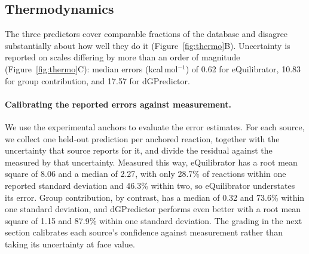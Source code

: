 \subsection{Thermodynamics}\label{sec:results-thermo}

The three predictors cover comparable fractions of the database and disagree substantially about how well they do it (Figure~\ref{fig:thermo}B). Uncertainty is reported on scales differing by more than an order of magnitude (Figure~\ref{fig:thermo}C): median errors (kcal\,mol$^{-1}$) of 0.62 for eQuilibrator, 10.83 for group contribution, and 17.57 for dGPredictor.

\paragraph{Calibrating the reported errors against measurement.} We use the experimental anchors to evaluate the error estimates.
For each source, we collect one held-out prediction per anchored reaction, together with the uncertainty that source reports for it, and divide the residual against the measured \drGo{} by that uncertainty.
Measured this way, eQuilibrator has a root mean square of 8.06 and a median of 2.27, with only 28.7\% of reactions within one reported standard deviation and 46.3\% within two, so eQuilibrator understates its error.
Group contribution, by contrast, has a median of 0.32 and 73.6\% within one standard deviation, and dGPredictor performs even better with a root mean square of 1.15 and 87.9\% within one standard deviation.
The grading in the next section calibrates each source's confidence against measurement rather than taking its uncertainty at face value.
